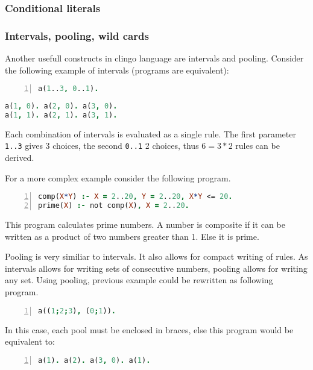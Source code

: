 \documentclass{fithesis}
\begin{document}
\subsubsection{Conditional literals}

\subsubsection{Intervals, pooling, wild cards}

Another usefull constructs in clingo language are intervals and pooling.
Consider the following example of intervals (programs are equivalent):

\begin{minipage}[t]{0.45\linewidth}%
\centering%
\begin{lstlisting}[language=prolog, numbers=left, countblanklines=false]
a(1..3, 0..1).
\end{lstlisting}
\end{minipage}
\hspace{1em}
\begin{minipage}[t]{0.45\linewidth}
\centering
\begin{lstlisting}[language=prolog, numbers=right, countblanklines=false]
a(1, 0). a(2, 0). a(3, 0).
a(1, 1). a(2, 1). a(3, 1).
\end{lstlisting}
\end{minipage}
Each combination of intervals is evaluated as a single rule. The first
parameter \texttt{1..3} gives 3 choices, the second \texttt{0..1} 2 choices,
thus $6=3*2$ rules can be derived.

For a more complex example consider the following program.
\begin{lstlisting}[language=prolog, numbers=left, countblanklines=false]
comp(X*Y) :- X = 2..20, Y = 2..20, X*Y <= 20.
prime(X) :- not comp(X), X = 2..20.
\end{lstlisting}
This program calculates prime numbers. A number is composite if it can be
written as a product of two numbers greater than 1. Else it is prime.

Pooling is very similiar to intervals. It also allows for compact writing
of rules. As intervals allows for writing sets of consecutive numbers,
pooling allows for writing any set. Using pooling, previous example could
be rewritten as following program.
\begin{lstlisting}[language=prolog, numbers=left, countblanklines=false]
a((1;2;3), (0;1)).
\end{lstlisting}
In this case, each pool must be enclosed in braces, else this program would
be equivalent to:
\begin{lstlisting}[language=prolog, numbers=left, countblanklines=false]
a(1). a(2). a(3, 0). a(1).
\end{lstlisting}
\end{document}
